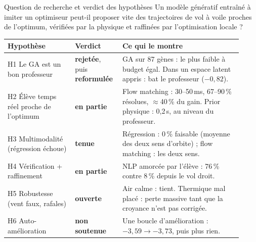 \documentclass[aspectratio=169,10pt]{beamer}
\newcommand{\good}[1]{\textcolor{climb}{\textbf{#1}}}
\newcommand{\bad}[1]{\textcolor{sink}{\textbf{#1}}}
\begin{document}
\begin{frame}{Question de recherche et verdict des hypothèses}
  \small Un modèle génératif entraîné à imiter un optimiseur peut-il proposer vite des trajectoires de vol à voile proches de l'optimum, vérifiées par la physique et raffinées par l'optimisation locale ?\par\medskip
  \footnotesize
  \begin{tabular}{@{}p{0.27\linewidth}p{0.17\linewidth}p{0.48\linewidth}@{}}
    \toprule
    Hypothèse & Verdict & Ce qui le montre \\ \midrule
    H1 Le GA est un bon professeur & \bad{rejetée}, puis \good{reformulée} & GA sur 87 gènes : le plus faible à budget égal. Dans un espace latent appris : bat le professeur ($-0{,}82$). \\
    H2 Élève temps réel proche de l'optimum & \textbf{en partie} & Flow matching : 30--50\,ms, 67--90\,\% résolues, $\approx$40\,\% du gain. Prior physique : 0{,}2\,s, au niveau du professeur. \\
    H3 Multimodalité (régression échoue) & \good{tenue} & Régression : 0\,\% faisable (moyenne des deux sens d'orbite) ; flow matching : les deux sens. \\
    H4 Vérification + raffinement & \textbf{en partie} & NLP amorcée par l'élève : 76\,\% contre 8\,\% depuis le vol droit. \\
    H5 Robustesse (vent faux, rafales) & \textbf{ouverte} & Air calme : tient. Thermique mal placé : perte massive tant que la croyance n'est pas corrigée. \\
    H6 Auto-amélioration & \bad{non soutenue} & Une boucle d'amélioration : $-3{,}59 \to -3{,}73$, puis plus rien. \\
    \bottomrule
  \end{tabular}
\end{frame}
\end{document}
